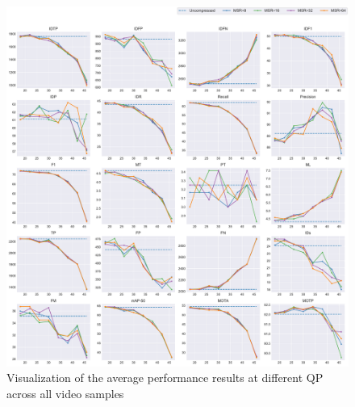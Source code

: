 \begin{figure}[!tb]
  \centering
  \includegraphics[width=1.0\linewidth]{img/averaged_all_multiplots_qp.pdf}
  \caption[Visualization of the average performance results at different QP of all video samples]
  {Visualization of the average performance results at different QP across all video samples}
  \label{fig:averaged_result_all_multiplots_qp}
\end{figure}